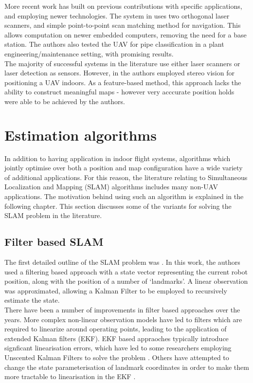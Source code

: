\documentclass[capstone_report.tex]{subfiles}
\begin{document}
More recent work has built on previous contributions with specific applications, and employing newer technologies. The system in \cite{kumar} uses two orthogonal laser scanners, and simple point-to-point scan matching method for navigation. This allows computation on newer embedded computers, removing the need for a base station. The authors also tested the UAV for pipe classification in a plant engineering/maintenance setting, with promising results.\\

The majority of successful systems in the literature use either laser scanners or laser detection as sensors. However, in \cite{mustafah} the authors employed stereo vision for positioning a UAV indoors. As a feature-based method, this approach lacks the ability to construct meaningful maps - however very acccurate position holds were able to be achieved by the authors.\\

\section{Estimation algorithms}
In addition to having application in indoor flight systems, algorithms which jointly optimise over both a position and map configuration have a wide variety of additional applications. For this reason, the literature relating to Simultaneous Localization and Mapping (SLAM) algorithms includes many non-UAV applications. The motivation behind using such an algorithm is explained in the following chapter. This section discusses some of the variants for solving the SLAM problem in the literature.\\

\subsection{Filter based SLAM}
The first detailed outline of the SLAM problem was \cite{smithcheese}. In this work, the authors used a filtering based approach with a state vector representing the current robot position, along with the position of a number of `landmarks'. A linear observation was approximated, allowing a Kalman Filter to be employed to recursively estimate the state.\\

There have been a number of improvements in filter based approaches over the years. More complex non-linear observation models have led to filters which are required to linearize around operating points, leading to the application of extended Kalman filters (EKF). EKF based appraoches typically introduce signficant linearisation errors, which have led to some researchers employing Unscented Kalman Filters to solve the problem \cite{julier}. Others have attempted to change the state parameterisation of landmark coordinates in order to make them more tractable to linearisation in the EKF \cite{julier}.\\
\end{document}
